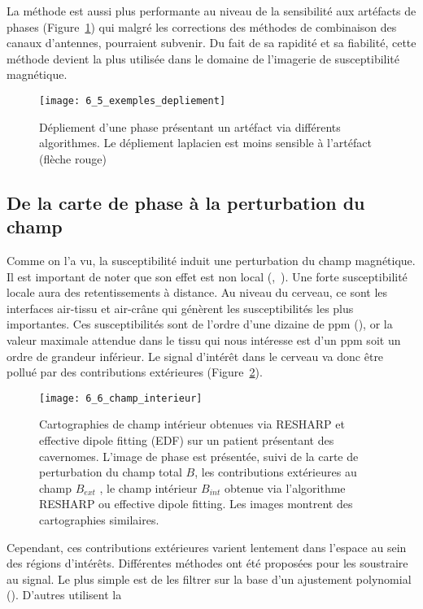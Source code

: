 {La méthode est aussi plus performante au niveau de la sensibilité aux artéfacts de phases
(Figure~\ref{fig:6_5_exemples_depliement}) qui malgré les corrections des méthodes de combinaison des canaux d’antennes,
pourraient subvenir. Du fait de sa rapidité et sa fiabilité, cette méthode devient la plus utilisée dans le
domaine de l’imagerie de susceptibilité magnétique.
\begin{figure}[!t]
\centering
\texttt{[image: 6\_5\_exemples\_depliement]}
\caption{Dépliement d'une phase présentant un artéfact via différents algorithmes. Le dépliement laplacien est
moins sensible à l’artéfact (flèche rouge)}
\label{fig:6_5_exemples_depliement}	
\end{figure}
\subsection{De la carte de phase à la perturbation du champ}
\label{sec:cartephasechamp}
Comme on l’a vu, la susceptibilité induit une perturbation du champ magnétique. Il est
important de noter que son effet est non local (\cite{Li2004},~\cite{Schweser2011}). Une forte susceptibilité locale aura des
retentissements à distance. Au niveau du cerveau, ce sont les interfaces air-tissu et air-crâne qui
génèrent les susceptibilités les plus importantes. Ces susceptibilités sont de l’ordre d’une dizaine de
ppm (\cite{Schenck1996}), or la valeur maximale attendue dans le tissu qui nous intéresse est d’un ppm soit un ordre
de grandeur inférieur. Le signal d’intérêt dans le cerveau va donc être pollué par des contributions
extérieures (Figure~\ref{fig:6_6_champ_interieur}). 
\begin{figure}[!t]
\centering
\texttt{[image: 6\_6\_champ\_interieur]}
\caption{Cartographies de champ intérieur obtenues via RESHARP et effective dipole fitting (EDF) sur un patient
présentant des cavernomes. L’image de phase est présentée, suivi de la carte de perturbation du champ total $B$, les
contributions extérieures au champ $B_{ext}$ , le champ intérieur $B_{int}$ obtenue via l’algorithme RESHARP ou effective dipole
fitting. Les images montrent des cartographies similaires.}
\label{fig:6_6_champ_interieur}	
\end{figure}
Cependant, ces contributions extérieures varient lentement dans l’espace au
sein des régions d’intérêts. Différentes méthodes ont été proposées pour les soustraire au signal. Le
plus simple est de les filtrer sur la base d’un ajustement polynomial (\cite{Duyn2007}). D’autres utilisent la
}
